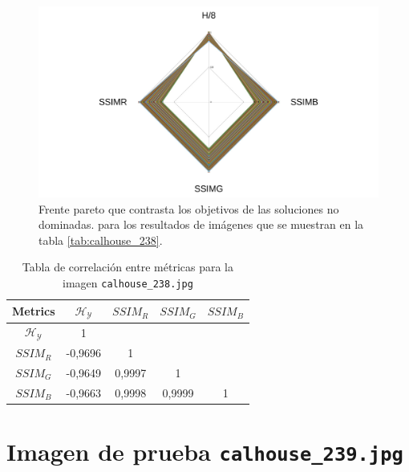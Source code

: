     \begin{figure}[H]
    \centering
    \includegraphics[width=\textwidth]{./Figures/calhouse_238/calhouse_238_2.jpg}
    \caption{Frente pareto que contrasta los objetivos de las soluciones no dominadas. para los resultados de imágenes que se muestran en la tabla \ref{tab:calhouse_238}.}
    \label{fig:calhouse2372fp}
    \end{figure}

\begin{table}[H]
\setlength{\abovecaptionskip}{2pt plus 3pt minus 2pt} %
\caption[Parámetros de entrada para $MOPSO$]{Tabla de correlación entre métricas para la imagen \texttt{calhouse\_238.jpg}}
\begin{center}
 \begin{tabular}{||c | c c c c||} 
 \hline
Metrics & $\mathscr{H_Y}$ & $SSIM_R$ & $SSIM_G$ & $SSIM_B$ \\ 
\hline
$\mathscr{H_Y}$ & 1 &  &  & \\ 
\hline
$SSIM_R$ & -0,9696 & 1 &  \\ 
\hline
$SSIM_G$ & -0,9649 & 0,9997  & 1  & \\ 
\hline
$SSIM_B$ & -0,9663 & 0,9998  & 0,9999  & 1 \\ 
\hline
\end{tabular}
\end{center}
\label{table:correlacion}
\end{table}


\section{Imagen de prueba \texttt{calhouse\_239.jpg}}

